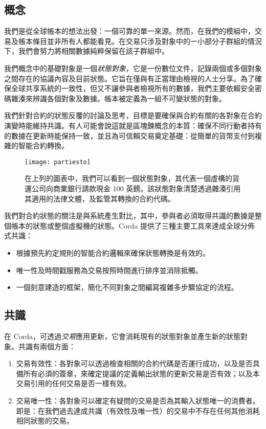 \documentclass[UTF8]{ctexart}
\begin{document}
\subsection{概念}
我們是從全球帳本的想法出發：一個可靠的單一來源。然而，在我們的模組中，交易及帳本條目並非所有人都能看見。在交易只涉及對象中的一小部分子群組的情況下，我們會努力將相關數據純粹保留在該子群組中。 

我們概念中的基礎對象是一個\textit{狀態對象}，它是一份數位文件，記錄兩個或多個對象之間存在的協議內容及目前狀態。它旨在僅與有正當理由檢視的人士分享。為了確保全球共享系統的一致性，但又不讓參與者檢視所有的數據，我們主要依賴安全密碼雜湊來辨識各個對象及數據。帳本被定義為一組不可變狀態的對象。

我們針對合約的狀態反覆的討論及思考，目標是要確保與合約有關的各對象在合約演變時能維持共識。有人可能會說這就是區塊鍊概念的本質：確保不同行動者持有的數據在更新時能保持一致，並且為可信賴交易奠定基礎：從簡單的貨幣支付到複雜的智能合約轉換。

\begin{figure}[H]
\texttt{[image: partiesto]}
\caption{在上列的圖表中，我們可以看到一個狀態對象，其代表一個虛構的貨運公司向商業銀行請款現金 100 英鎊。該狀態對象清楚透過雜湊引用其適用的法律文體，及監管其轉換的合約代碼。}
\end{figure}

我們對合約狀態的關注是與系統產生對比，其中，參與者必須取得共識的數據是整個帳本的狀態或整個虛擬機的狀態。Corda 提供了三種主要工具來達成全球分佈式共識：
\begin{itemize}
    \item 根據預先約定規則的智能合約邏輯來確保狀態轉換是有效的。
    \item 唯一性及時間戳服務為交易按照時間進行排序並消除抵觸。
    \item 一個刻意建造的框架，簡化不同對象之間編寫複雜多步驟協定的流程。
    \end{itemize}
    
\subsection{共識}
在 Corda，可透過\textit{交易}應用更新，它會消耗現有的狀態對象並產生新的狀態對象。共識有兩個方面：
\begin{enumerate}
\item{交易有效性：各對象可以透過檢查相關的合約代碼是否運行成功，以及是否具備所有必須的簽章，來確定提議的定義輸出狀態的更新交易是否有效；以及本交易引用的任何交易是否一樣有效。}
\item{交易唯一性：各對象可以確定有疑問的交易是否為其輸入狀態唯一的消費者。即是：在我們過去達成共識（有效性及唯一性）的交易中不存在任何其他消耗相同狀態的交易。}
\end{enumerate}
\end{document}
